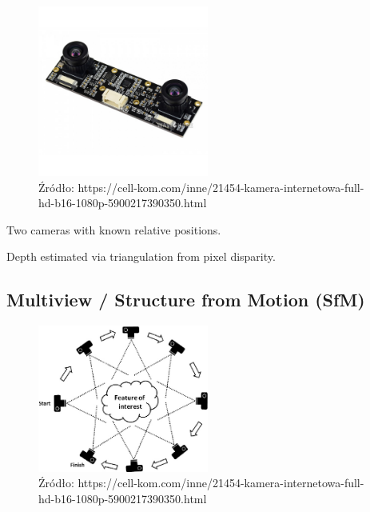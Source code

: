 \documentclass[magisterska]{pracadypl}
\begin{document}
\begin{figure}[h]  %
    \centering  %
    \includegraphics[width=0.5\textwidth]{images/STEREO.jpg}  %
    \captionsetup{labelformat=empty, font=footnotesize}
    \caption{Źródło: https://cell-kom.com/inne/21454-kamera-internetowa-full-hd-b16-1080p-5900217390350.html}
    \label{fig:mono}  %
\end{figure}

Two cameras with known relative positions.

Depth estimated via triangulation from pixel disparity.

\subsection{Multiview / Structure from Motion (SfM)}

\begin{figure}[h]  %
    \centering  %
    \includegraphics[width=0.5\textwidth]{images/SFM.png}  %
    \captionsetup{labelformat=empty, font=footnotesize}
    \caption{Źródło: https://cell-kom.com/inne/21454-kamera-internetowa-full-hd-b16-1080p-5900217390350.html}
    \label{fig:mono}  %
\end{figure}
\end{document}
